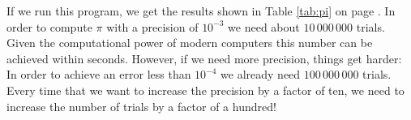 If we run this program, we get the results shown in Table \ref{tab:pi} on page \pageref{tab:pi}.
In order to compute $\pi$ with a precision of $10^{-3}$ we need about $10\,000\,000$ trials.  Given the
computational power of modern computers this number can be achieved within seconds.  However,  if we need more
precision, things get harder:  In order to achieve an error less than  $10^{-4}$ we already need
$100\,000\,000$ trials.  Every time that we want to increase the precision by a factor of ten, we need to
increase the number of trials by a factor of a hundred!


\begin{center}
\colorbox{red}{}
\end{center}


